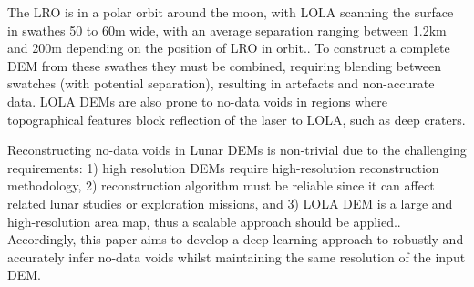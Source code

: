 \documentclass[twocolumn]{article}
\begin{document}
The LRO is in a polar orbit around the moon, with LOLA scanning the surface in swathes 50 to 60m wide, with an average separation ranging between 1.2km and 200m depending on the position of LRO in orbit.\autocite{smithLunarOrbiterLaser2010}.
To construct a complete DEM from these swathes they must be combined, requiring blending between swatches (with potential separation), resulting in artefacts and non-accurate data.
LOLA DEMs are also prone to no-data voids in regions where topographical features block reflection of the laser to LOLA, such as deep craters.

Reconstructing no-data voids in Lunar DEMs is non-trivial due to the challenging requirements: 1) high resolution DEMs require high-resolution reconstruction methodology, 2) reconstruction algorithm must be reliable since it can affect related lunar studies or exploration missions, and 3) LOLA DEM is a large and high-resolution area map, thus a scalable approach should be applied.\autocite{parkNeuralProcessApproach2021}.
Accordingly, this paper aims to develop a deep learning approach to robustly and accurately infer no-data voids whilst maintaining the same resolution of the input DEM.
\printbibliography
\end{document}
